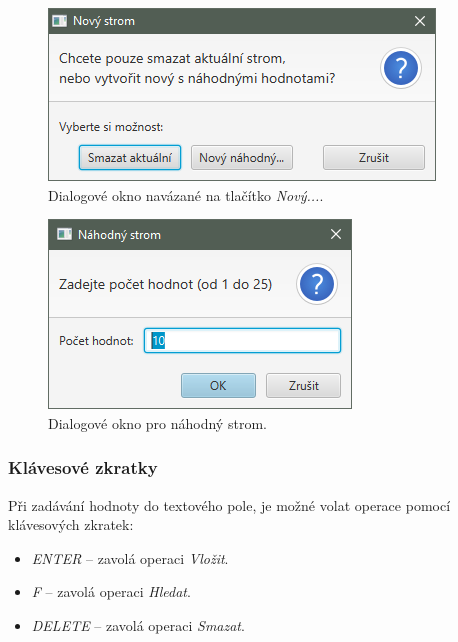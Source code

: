 \documentclass[
  biblatex=false,
  font=serif,
  glossaries=false,
  tables=false,
  theorems=false,
  index
]{kidiplom}
\begin{document}
\begin{figure}[h!]
\centering
	\includegraphics[scale=0.8]{obrazky/36Dialog.png}
	\caption{Dialogové okno navázané na tlačítko \textit{Nový...}.}
	\label{dialogNovy}
\end{figure}
								
\begin{figure}[h!]
\centering
	\includegraphics[scale=0.8]{obrazky/38Dialog3.png}
	\caption{Dialogové okno pro náhodný strom.}
	\label{dialogNahodny}
\end{figure}




\FloatBarrier
\subsubsection{Klávesové zkratky}
Při zadávání hodnoty do textového pole, je možné volat operace pomocí klávesových zkratek:
\begin{itemize}
\item \textit{ENTER} -- zavolá operaci \textit{Vložit}.
\item \textit{F} -- zavolá operaci \textit{Hledat}.
\item \textit{DELETE} -- zavolá operaci \textit{Smazat}.
\end{itemize}
\end{document}
